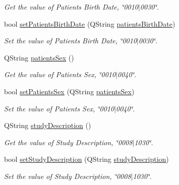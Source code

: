 \begin{DoxyCompactItemize}
\begin{DoxyCompactList}\small\item\em Get the value of Patient\textquotesingle{}s Birth Date, \char`\"{}0010$\vert$0030\char`\"{}. \end{DoxyCompactList}\item 
bool \hyperlink{class_dicom_dictionary_interface_ab119dcc2983350c039c242d5797ac841}{set\+Patients\+Birth\+Date} (Q\+String \hyperlink{class_dicom_dictionary_interface_aad0d067a3af09163b58aadde3feb792f}{patients\+Birth\+Date})
\begin{DoxyCompactList}\small\item\em Set the value of Patient\textquotesingle{}s Birth Date, \char`\"{}0010$\vert$0030\char`\"{}. \end{DoxyCompactList}\item 
Q\+String \hyperlink{class_dicom_dictionary_interface_a73afb9037b49ac5e3c6f7e2eebd7d7d9}{patients\+Sex} ()
\begin{DoxyCompactList}\small\item\em Get the value of Patient\textquotesingle{}s Sex, \char`\"{}0010$\vert$0040\char`\"{}. \end{DoxyCompactList}\item 
bool \hyperlink{class_dicom_dictionary_interface_a3817ad4c976c14cc74d7e75e86dc0979}{set\+Patients\+Sex} (Q\+String \hyperlink{class_dicom_dictionary_interface_a73afb9037b49ac5e3c6f7e2eebd7d7d9}{patients\+Sex})
\begin{DoxyCompactList}\small\item\em Set the value of Patient\textquotesingle{}s Sex, \char`\"{}0010$\vert$0040\char`\"{}. \end{DoxyCompactList}\item 
Q\+String \hyperlink{class_dicom_dictionary_interface_a3adae61e4fd6287486b0d30f97e2baa3}{study\+Description} ()
\begin{DoxyCompactList}\small\item\em Get the value of Study Description, \char`\"{}0008$\vert$1030\char`\"{}. \end{DoxyCompactList}\item 
bool \hyperlink{class_dicom_dictionary_interface_a9e9f77bd949b1e3b6b31899fd8ad68ec}{set\+Study\+Description} (Q\+String \hyperlink{class_dicom_dictionary_interface_a3adae61e4fd6287486b0d30f97e2baa3}{study\+Description})
\begin{DoxyCompactList}\small\item\em Set the value of Study Description, \char`\"{}0008$\vert$1030\char`\"{}. \end{DoxyCompactList}\item 

\end{DoxyCompactItemize}

